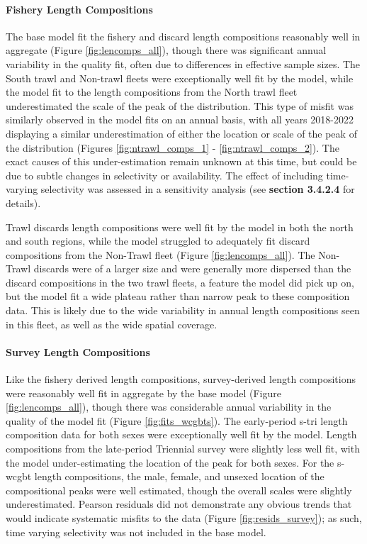 \documentclass[11pt,
  english,
  letterpaper,
]{article}
\begin{document}
\hypertarget{fishery-length-compositions-1}{%
\paragraph{Fishery Length Compositions}\label{fishery-length-compositions-1}}

The base model fit the fishery and discard length compositions reasonably well in aggregate (Figure \ref{fig:lencomps_all}), though there was significant annual variability in the quality fit, often due to differences in effective sample sizes. The South trawl and Non-trawl fleets were exceptionally well fit by the model, while the model fit to the length compositions from the North trawl fleet underestimated the scale of the peak of the distribution. This type of misfit was similarly observed in the model fits on an annual basis, with all years 2018-2022 displaying a similar underestimation of either the location or scale of the peak of the distribution (Figures \ref{fig:ntrawl_comps_1} - \ref{fig:ntrawl_comps_2}). The exact causes of this under-estimation remain unknown at this time, but could be due to subtle changes in selectivity or availability. The effect of including time-varying selectivity was assessed in a sensitivity analysis (see \textbf{section 3.4.2.4} for details).

Trawl discards length compositions were well fit by the model in both the north and south regions, while the model struggled to adequately fit discard compositions from the Non-Trawl fleet (Figure \ref{fig:lencomps_all}). The Non-Trawl discards were of a larger size and were generally more dispersed than the discard compositions in the two trawl fleets, a feature the model did pick up on, but the model fit a wide plateau rather than narrow peak to these composition data. This is likely due to the wide variability in annual length compositions seen in this fleet, as well as the wide spatial coverage.

\hypertarget{survey-length-compositions}{%
\paragraph{Survey Length Compositions}\label{survey-length-compositions}}

Like the fishery derived length compositions, survey-derived length compositions were reasonably well fit in aggregate by the base model (Figure \ref{fig:lencomps_all}), though there was considerable annual variability in the quality of the model fit (Figure \ref{fig:fits_wcgbts}). The early-period \gls{s-tri} length composition data for both sexes were exceptionally well fit by the model. Length compositions from the late-period Triennial survey were slightly less well fit, with the model under-estimating the location of the peak for both sexes. For the \gls{s-wcgbt} length compositions, the male, female, and unsexed location of the compositional peaks were well estimated, though the overall scales were slightly underestimated. Pearson residuals did not demonstrate any obvious trends that would indicate systematic misfits to the data (Figure \ref{fig:resids_survey}); as such, time varying selectivity was not included in the base model.
\end{document}
